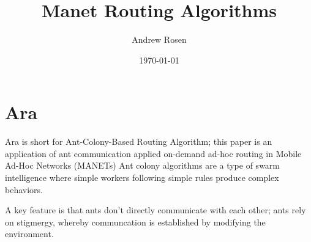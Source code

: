 \documentclass[a4paper]{article}
\title{Manet Routing Algorithms}
\author{Andrew Rosen}
\date{\today}
\begin{document}
\maketitle
\section{Ara}
Ara \cite{ara-ants} is short for Ant-Colony-Based Routing Algorithm; this paper is an application of ant communication applied on-demand ad-hoc routing in Mobile Ad-Hoc Networks (MANETs)
Ant colony algorithms are a type of swarm intelligence where simple workers following simple rules produce complex behaviors.  

A key feature is that ants don't directly communicate with each other; ants rely on stigmergy, whereby communcation is established by modifying the environment.
\end{document}
